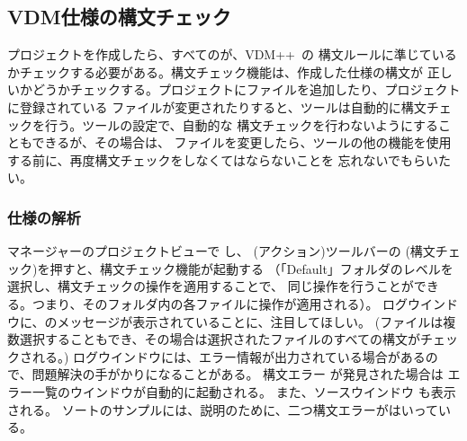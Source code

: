 \documentclass[\pformat,12pt]{jarticle}
\newcommand{\vdmslpp}{VDM++}
\newcommand{\guicmd}[1]{{\gt #1}}
\begin{document}
\subsection{VDM仕様の構文チェック} 


プロジェクトを作成したら、すべてのが、\vdmslpp\ の
構文ルールに準じているかチェックする必要がある。構文チェック機能は、作成した仕様の構文が
正しいかどうかチェックする。プロジェクトにファイルを追加したり、プロジェクトに登録されている
ファイルが変更されたりすると、ツールは自動的に構文チェックを行う。ツールの設定で、自動的な
構文チェックを行わないようにすることもできるが、その場合は、
ファイルを変更したら、ツールの他の機能を使用する前に、再度構文チェックをしなくてはならないことを
忘れないでもらいたい。

\subsubsection{仕様の解析}


\guicmd{マネージャー}の\guicmd{プロジェクトビュー}で
し、 
(\guicmd{アクション})ツールバーの  
(\guicmd{構文チェック})を押すと、構文チェック機能が起動する
（「Default」フォルダのレベルを選択し、構文チェックの操作を適用することで、
同じ操作を行うことができる。つまり、そのフォルダ内の各ファイルに操作が適用される）。
\guicmd{ログウインドウ}に、のメッセージが表示されていることに、注目してほしい。
(ファイルは複数選択することもでき、その場合は選択されたファイルのすべての構文がチェックされる。)
\guicmd{ログウインドウ}には、エラー情報が出力されている場合があるので、問題解決の手がかりになることがある。
構文エラー が発見された場合は
\guicmd{エラー一覧}のウインドウが自動的に起動される。
また、\guicmd{ソースウインドウ} も表示される。
ソートのサンプルには、説明のために、二つ構文エラーがはいっている。
\end{document}
